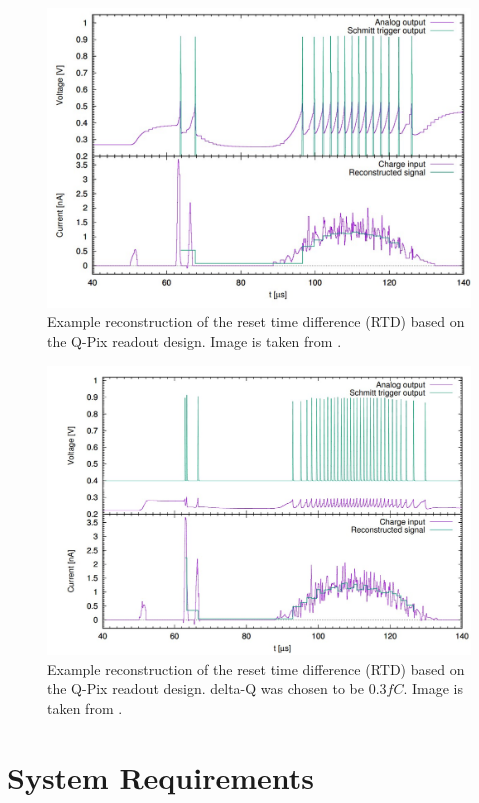\begin{figure}[ht!]
\centering
\includegraphics[width=\textwidth]{images/qpix_rtd_reconstruction_example.jpg}
\caption{Example reconstruction of the reset time difference (RTD) based on the Q-Pix readout design. Image is taken from \citep{qpix:nygren:mei}.}
\end{figure}

\begin{figure}[ht!]
\centering
\includegraphics[width=\textwidth]{images/qpix_rtd_reconstruction_example_03fc.jpg}
\caption{Example reconstruction of the reset time difference (RTD) based on the Q-Pix readout design. delta-Q was chosen to be $0.3 fC$. Image is taken from \citep{qpix:nygren:mei}.}
\end{figure}

\section{System Requirements}

